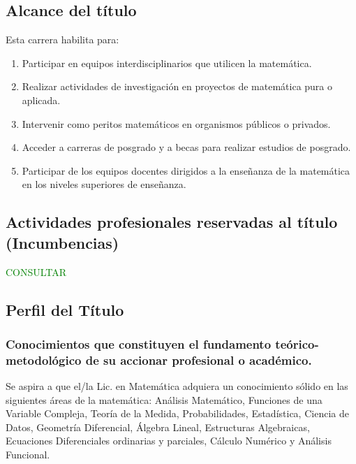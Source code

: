 \documentclass[a4paper, 12pt]{article}
\begin{document}
\subsection{Alcance del título} Esta carrera habilita para:
    \begin{enumerate}

        \item Participar en equipos interdisciplinarios que utilicen la matemática.
        
        \item  Realizar actividades de investigación en proyectos de matemática         pura o aplicada.
       
       \item Intervenir como peritos matemáticos en organismos públicos o privados. 
       
        \item Acceder a carreras de posgrado y a becas para realizar estudios de posgrado.
       
       \item Participar de los equipos docentes dirigidos a la
         enseñanza de la matemática en los niveles superiores de enseñanza.
    
       
         
    \end{enumerate}

\subsection{Actividades profesionales reservadas al título (Incumbencias)}

\textcolor{green}{CONSULTAR}
    
\subsection{Perfil del Título}
 


\subsubsection{Conocimientos que constituyen el fundamento teórico-metodológico de su accionar profesional o académico.}

Se aspira a que el/la Lic. en Matemática adquiera un conocimiento sólido en las siguientes  áreas de
 la matemática: Análisis Matemático, Funciones de una Variable Compleja,   Teoría de la Medida, Probabilidades,  Estadística,  Ciencia de Datos, Geometría Diferencial, Álgebra Lineal, Estructuras Algebraicas, Ecuaciones Diferenciales ordinarias y parciales, Cálculo Numérico y Análisis Funcional.
 
\end{document}

